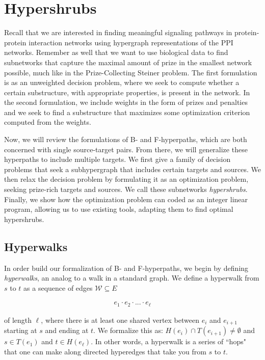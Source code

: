 \documentclass[12pt,twoside]{reedthesis}
\theoremstyle{definition}
\begin{document}
\chapter{Hypershrubs}

Recall that we are interested in finding meaningful signaling pathways in protein-protein interaction networks using hypergraph representations of the PPI networks. Remember as well that we want to use biological data to find subnetworks that capture the maximal amount of prize in the smallest network possible, much like in the Prize-Collecting Steiner problem. The first formulation is as an unweighted decision problem, where we seek to compute whether a certain substructure, with appropriate properties, is present in the network. In the second formulation, we include weights in the form of prizes and penalties and we seek to find a substructure that maximizes some optimization criterion computed from the weights.\par

Now, we will review the formulations of B- and F-hyperpaths, which are both concerned with single source-target pairs. From there, we will generalize these hyperpaths to include multiple targets. We first give a family of decision problems that seek a subhypergraph that includes certain targets and sources. We then relax the decision problem by formulating it as an optimization problem, seeking prize-rich targets and sources. We call these subnetworks \textit{hypershrubs}. Finally, we show how the optimization problem can coded as an integer linear program, allowing us to use existing tools, adapting them to find optimal hypershrubs.\par

\section{Hyperwalks}
In order build our formalization of B- and F-hyperpaths, we begin by defining \textit{hyperwalks}, an analog to a walk in a standard graph. We define a hyperwalk from $s$ to $t$ as a sequence of edges $\mathcal{W} \subseteq E$

\begin{align*}
  e_1 \cdot e_2 \cdot ... \cdot e_\ell
\end{align*}

of length $\ell$, where there is at least one shared vertex between $e_i$ and $e_{i+1}$ starting at $s$ and ending at $t$. We formalize this as: $H(e_i) \cap T(e_{i+1}) \neq \emptyset$ and $s \in T(e_1)$ and $t \in H(e_\ell)$. In other words, a hyperwalk is a series of ``hops" that one can make along directed hyperedges that take you from $s$ to $t$.\par
\end{document}
